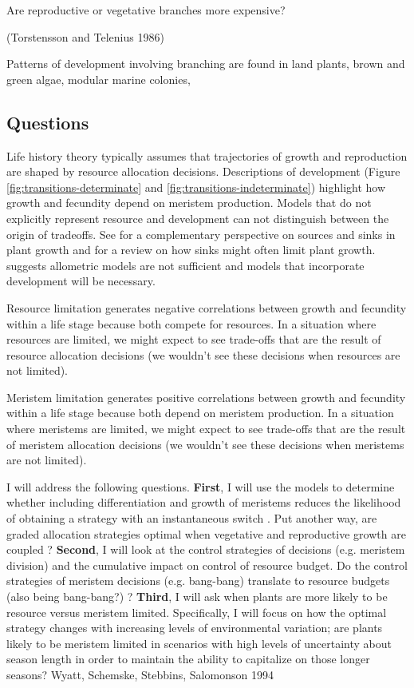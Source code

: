 \documentclass[12pt, oneside]{article}   	%
\begin{document}
Are reproductive or vegetative branches more expensive?

(Torstensson and Telenius 1986) 

Patterns of development involving branching are found in land plants, brown and green algae, modular marine colonies, 


\subsection{Questions}

Life history theory typically assumes that trajectories of growth and reproduction are shaped by resource allocation decisions. Descriptions of development (Figure \ref{fig:transitions-determinate} and \ref{fig:transitions-indeterminate}) highlight how growth and fecundity depend on meristem production. Models that do not explicitly represent resource and development can not distinguish between the origin of tradeoffs. See \cite{white2016} for a complementary perspective on sources and sinks in plant growth and \cite{korner2015} for a review on how sinks might often limit plant growth. \cite{Fox1992} suggests allometric models are not sufficient and models that incorporate development will be necessary.

Resource limitation generates negative correlations between growth and fecundity within a life stage because both compete for resources. In a situation where resources are limited, we might expect to see trade-offs that are the result of resource allocation decisions (we wouldn't see these decisions when resources are not limited).

Meristem limitation generates positive correlations between growth and fecundity within a life stage because both depend on meristem production. In a situation where meristems are limited, we might expect to see trade-offs that are the result of meristem allocation decisions (we wouldn't see these decisions when meristems are not limited). 

I will address the following questions. \textbf{First}, I will use the models to determine whether including differentiation and growth of meristems reduces the likelihood of obtaining a strategy with an instantaneous switch \cite{Cohen1971}. Put another way, are graded allocation strategies optimal when vegetative and reproductive growth are coupled \cite{Fox1992}? \textbf{Second}, I will look at the control strategies of decisions (e.g. meristem division) and the cumulative impact on control of resource budget. Do the control strategies of meristem decisions (e.g. bang-bang) translate to resource budgets (also being bang-bang?) \cite{Fox1992}? \textbf{Third}, I will ask when plants are more likely to be resource versus meristem limited. Specifically, I will focus on how the optimal strategy changes with increasing levels of environmental variation; are plants likely to be meristem limited in scenarios with high levels of uncertainty about season length in order to maintain the ability to capitalize on those longer seasons? Wyatt, Schemske, Stebbins, Salomonson 1994 
\end{document}
